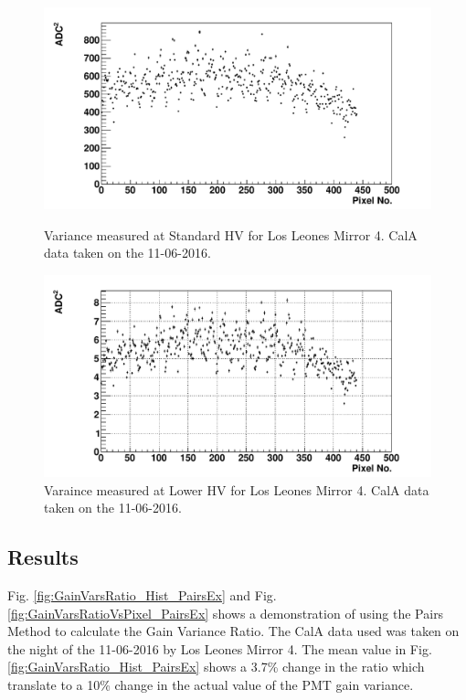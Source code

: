 \begin{figure} %
\includegraphics[width=\textwidth]{chapters/graphs/GainVarsMeas/LL_m04_2016-06-11/Set0and2/varianceHist_StandHV_Pairs_set0and2.pdf}
\caption{Variance measured at Standard HV for Los Leones Mirror 4. CalA data taken on the 11-06-2016.}
\vspace{3mm}
\includegraphics[width=\textwidth]{chapters/graphs/GainVarsMeas/LL_m04_2016-06-11/Set0and2/varianceHist_LowHV_Pairs_set0and2.pdf}
\caption{Varaince measured at Lower HV for Los Leones Mirror 4. CalA data taken on the 11-06-2016.} \label{fig:CalAVarsADC_Pairs}
\end{figure}

\subsection{Results}

Fig. \ref{fig:GainVarsRatio_Hist_PairsEx} and Fig. \ref{fig:GainVarsRatioVsPixel_PairsEx} shows a demonstration of using the Pairs Method to calculate the Gain Variance Ratio. The CalA data used was taken on the night of the 11-06-2016 by Los Leones Mirror 4. The mean value in Fig. \ref{fig:GainVarsRatio_Hist_PairsEx} shows a 3.7\% change in the ratio which translate to a 10\% change in the actual value of the PMT gain variance.

